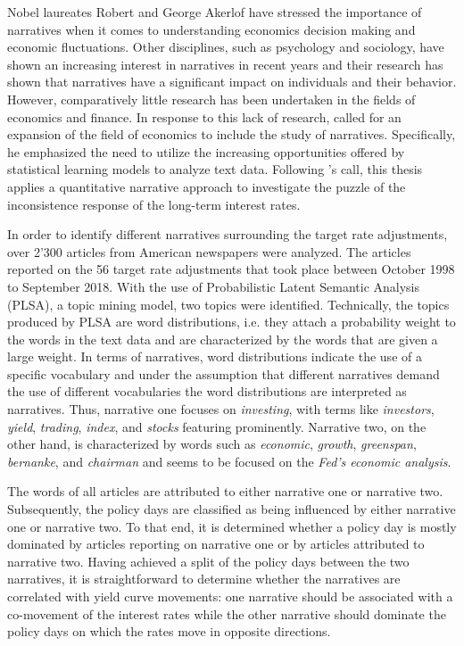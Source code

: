 \documentclass[11pt,a4paper,english,oneside]{book}
\numberwithin{equation}{chapter}
\begin{document}
Nobel laureates Robert \citeauthor{Shiller.2017} and George Akerlof have stressed the importance of narratives when it comes to understanding economics decision making and economic fluctuations. Other disciplines, such as psychology and sociology, have shown an increasing interest in narratives in recent years and their research has shown that narratives have a significant impact on individuals and their behavior. However, comparatively little research has been undertaken in the fields of economics and finance. In response to this lack of research, \citeauthor{Shiller.2017} called for an expansion of the field of economics to include the study of narratives. Specifically, he emphasized the need to utilize the increasing opportunities offered by statistical learning models to analyze text data.
Following \citeauthor{Shiller.2017}'s call, this thesis applies a quantitative narrative approach to investigate the puzzle of the inconsistence response of the long-term interest rates.

In order to identify different narratives surrounding the target rate adjustments, over 2'300 articles from American newspapers were analyzed. The articles reported on the 56 target rate adjustments that took place between October 1998 to September 2018. With the use of Probabilistic Latent Semantic Analysis (PLSA), a topic mining model, two topics were identified. Technically, the topics produced by PLSA are word distributions, i.e. they attach a probability weight to the words in the text data and are characterized by the words that are given a large weight. In terms of narratives, word distributions indicate the use of a specific vocabulary and under the assumption that different narratives demand the use of different vocabularies the word distributions are interpreted as narratives. Thus, narrative one focuses on \textit{investing}, with terms like \textit{investors}, \textit{yield}, \textit{trading}, \textit{index}, and \textit{stocks} featuring prominently. Narrative two, on the other hand, is characterized by words such as \textit{economic}, \textit{growth}, \textit{greenspan}, \textit{bernanke}, and \textit{chairman} and seems to be focused  on the \textit{Fed's economic analysis}. 

The words of all articles are attributed to either narrative one or narrative two. Subsequently, the policy days are classified as being influenced by either narrative one or narrative two. To that end, it is determined whether a policy day is mostly dominated by articles reporting on narrative one or by articles attributed to narrative two. Having achieved a split of the policy days between the two narratives, it is straightforward to determine whether the narratives are correlated with yield curve movements: one narrative should be associated with a co-movement of the interest rates while the other narrative should dominate the policy days on which the rates move in opposite directions. 
\end{document}
